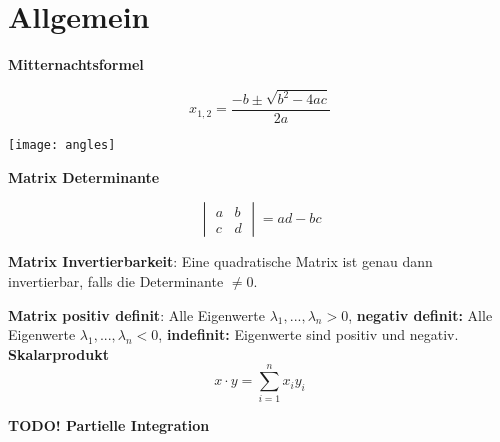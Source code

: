 \section{Allgemein}

\textbf{Mitternachtsformel}

\[
    x_{1, 2} = \frac{-b \pm \sqrt{b^2 - 4ac}}{2a}
\]

\texttt{[image: angles]}

\textbf{Matrix Determinante}

\[
    \begin{vmatrix}
        a & b\\
        c & d
    \end{vmatrix} = ad-bc
\]

\textbf{Matrix Invertierbarkeit}: Eine quadratische Matrix ist genau dann invertierbar, falls die Determinante $\neq 0$.

\textbf{Matrix positiv definit}: Alle Eigenwerte $\lambda_1, ..., \lambda_n > 0$, \textbf{negativ definit:} Alle Eigenwerte $\lambda_1, ..., \lambda_n < 0$, \textbf{indefinit:} Eigenwerte sind positiv und negativ.\\

\textbf{Skalarprodukt} \[ x \cdot y = \sum_{i=1}^n x_i y_i \]

\textbf{TODO! Partielle Integration}